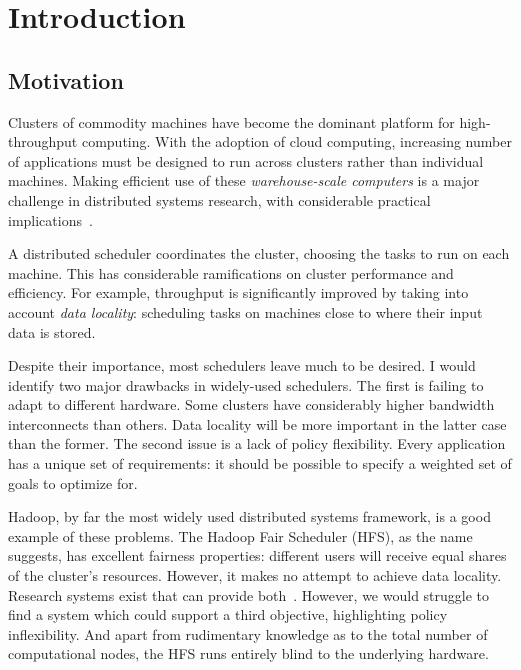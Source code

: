\chapter{Introduction} \label{chap:intro}


\section{Motivation} \label{sec:intro-motivation}
Clusters of commodity machines have become the dominant platform for high-throughput computing. With the adoption of cloud computing, increasing number of applications must be designed to run across clusters rather than individual machines. Making efficient use of these \emph{warehouse-scale computers} is a major challenge in distributed systems research, with considerable practical implications~\cite{WarehouseScale:2009}.

A distributed scheduler coordinates the cluster, choosing the tasks to run on each machine. This has considerable ramifications on cluster performance and efficiency. For example, throughput is significantly improved by taking into account \emph{data locality}: scheduling tasks on machines close to where their input data is stored. 

Despite their importance, most schedulers leave much to be desired. I would identify two major drawbacks in widely-used schedulers. The first is failing to adapt to different hardware. Some clusters have considerably higher bandwidth interconnects than others. Data locality will be more important in the latter case than the former. The second issue is a lack of policy flexibility. Every application has a unique set of requirements: it should be possible to specify a weighted set of goals to optimize for.

Hadoop, by far the most widely used distributed systems framework, is a good example of these problems. The Hadoop Fair Scheduler (HFS), as the name suggests, has excellent fairness properties: different users will receive equal shares of the cluster's resources. However, it makes no attempt to achieve data locality. Research systems exist that can provide both~\cite{Zaharia:2010}. However, we would struggle to find a system which could support a third objective, highlighting policy inflexibility. And apart from rudimentary knowledge as to the total number of computational nodes, the HFS runs entirely blind to the underlying hardware.

